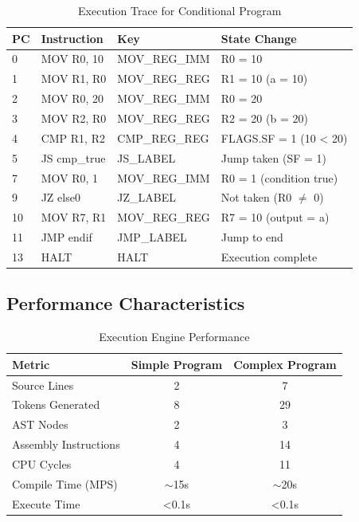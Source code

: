 \documentclass[11pt,a4paper]{article}
\begin{document}
\begin{table}[H]
\centering
\caption{Execution Trace for Conditional Program}
\label{tab:trace}
\begin{tabular}{@{}lllp{5cm}@{}}
\toprule
\textbf{PC} & \textbf{Instruction} & \textbf{Key} & \textbf{State Change} \\
\midrule
0 & MOV R0, 10 & MOV\_REG\_IMM & R0 = 10 \\
1 & MOV R1, R0 & MOV\_REG\_REG & R1 = 10 (a = 10) \\
2 & MOV R0, 20 & MOV\_REG\_IMM & R0 = 20 \\
3 & MOV R2, R0 & MOV\_REG\_REG & R2 = 20 (b = 20) \\
4 & CMP R1, R2 & CMP\_REG\_REG & FLAGS.SF = 1 (10 < 20) \\
5 & JS cmp\_true & JS\_LABEL & Jump taken (SF = 1) \\
7 & MOV R0, 1 & MOV\_REG\_IMM & R0 = 1 (condition true) \\
9 & JZ else0 & JZ\_LABEL & Not taken (R0 $\neq$ 0) \\
10 & MOV R7, R1 & MOV\_REG\_REG & R7 = 10 (output = a) \\
11 & JMP endif & JMP\_LABEL & Jump to end \\
13 & HALT & HALT & Execution complete \\
\bottomrule
\end{tabular}
\end{table}

\subsection{Performance Characteristics}

\begin{table}[H]
\centering
\caption{Execution Engine Performance}
\label{tab:performance}
\begin{tabular}{@{}lcc@{}}
\toprule
\textbf{Metric} & \textbf{Simple Program} & \textbf{Complex Program} \\
\midrule
Source Lines & 2 & 7 \\
Tokens Generated & 8 & 29 \\
AST Nodes & 2 & 3 \\
Assembly Instructions & 4 & 14 \\
CPU Cycles & 4 & 11 \\
Compile Time (MPS) & $\sim$15s & $\sim$20s \\
Execute Time & <0.1s & <0.1s \\
\bottomrule
\end{tabular}
\end{table}
\end{document}
